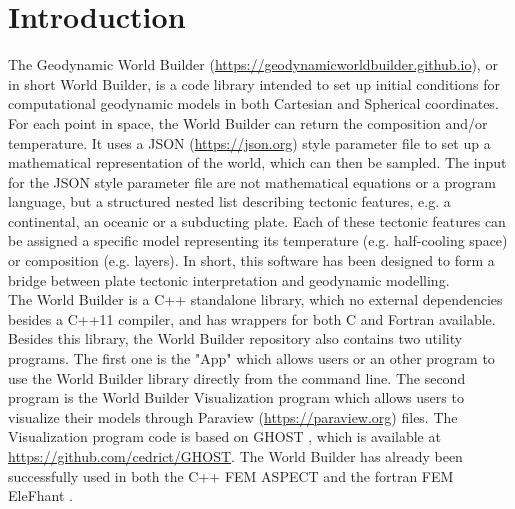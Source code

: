 \documentclass{book}
\newcommand{\GWB}{{Geodynamic World Builder}}
\newcommand{\WB}{{World Builder}}
\newcommand{\paraview}{{Paraview}}
\newcommand{\ghost}{{GHOST}}
\newcommand{\aspect}{{ASPECT}}
\newcommand{\elephant}{{EleFhant}}
\begin{document}
\chapter{Introduction}
The \GWB{} (\url{https://geodynamicworldbuilder.github.io}), or in short \WB{}, is a code library intended to set up initial conditions for computational geodynamic models in both Cartesian and Spherical coordinates. For each point in space, the \WB{} can return the composition and/or temperature. It uses a JSON (\url{https://json.org}) style parameter file to set up a mathematical representation of the world, which can then be sampled. The input for the JSON style parameter file are not mathematical equations or a program language, but a structured nested list describing tectonic features, e.g. a continental, an oceanic or a subducting plate. Each of these tectonic features can be assigned a specific model representing its temperature (e.g. half-cooling space) or composition (e.g. layers). In short, this software has been designed to form a bridge between plate tectonic interpretation and geodynamic modelling.
\\
The \WB{} is a C++ standalone library, which no external dependencies besides a C++11 compiler, and has wrappers for both C and Fortran available. Besides this library, the \WB{} repository also contains two utility programs. The first one is the "App" which allows users or an other program to use the \WB{} library directly from the command line. The second program is the \WB{} Visualization program which allows users to visualize their models through \paraview{} (\url{https://paraview.org}) files. The Visualization program code is based on \ghost{} \citep{Thieulot_2018}, which is available at \url{https://github.com/cedrict/GHOST}. The \WB{} has already been successfully used in both the C++ FEM \aspect{} \citep{KHB12,heister_aspect_methods2,aspect-doi-v2.0.1,aspectmanual} and the fortran FEM \elephant{} \citep{Thieulot_2017}.
\end{document}
